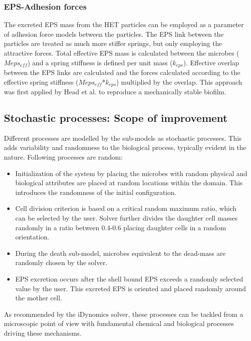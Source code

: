 \documentclass[11pt,a4paper,openright]{article}
\begin{document}
\subsubsection{EPS-Adhesion forces}\label{adhmol}
The excreted EPS mass from the HET particles can be employed as a parameter of adhesion force models between the particles. The EPS link between the particles are treated as much more stiffer springs, but only employing the attractive forces. Total effective EPS mass is calculated between the microbes ($Meps_{eff}$) and a spring stiffness is defined per unit mass ($k_{eps}$). Effective overlap between the EPS links are calculated and the forces calculated according to the effective spring stiffness ($Meps_{eff}$*$k_{eps}$) multiplied by the overlap. This approach was first applied by Head et al. to reproduce a mechanically stable biofilm. 


\subsection{Stochastic processes: Scope of improvement}
Different processes are modelled by the sub-models as stochastic processes. This adds variability and randomness to the biological process, typically evident in the nature. Following processes are random:

\begin{itemize}
\item Initialization of the system by placing the microbes with random physical and biological attributes are placed at random locations within the domain. This introduces the randomness of the initial configuration. 

\item Cell division criterion is based on a critical random maximum ratio, which can be selected by the user. Solver further divides the daughter cell masses randomly in a ratio between 0.4-0.6 placing daughter cells in a random orientation. 

\item During the death sub-model, microbes equivalent to the dead-mass are randomly chosen by the solver. 

\item EPS excretion occurs after the shell bound EPS exceeds a randomly selected value by the user. This excreted EPS is oriented and placed randomly around the mother cell. 

\end{itemize}

As recommended by the iDynomics solver, these processes can be tackled from a microscopic point of view with fundamental chemical and biological processes driving these mechanisms.   
\end{document}
